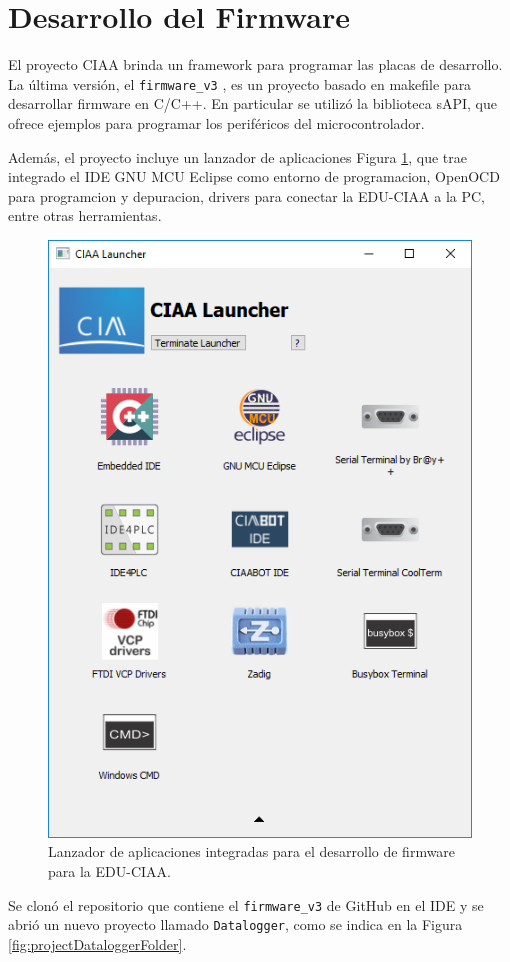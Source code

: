 \section{Desarrollo del Firmware}\label{sec:desarrolloFirmware}

El proyecto CIAA brinda un framework para programar las placas de desarrollo. La última versión, el \texttt{firmware\_v3} \cite{ciaa2024}, es un proyecto basado en makefile para desarrollar firmware en C/C++. En particular se utilizó la biblioteca sAPI, que ofrece ejemplos para programar los periféricos del microcontrolador.

Además, el proyecto incluye un lanzador de aplicaciones Figura \ref{fig:ciaaLauncher}, que trae integrado el IDE GNU MCU Eclipse como entorno de programacion, OpenOCD para programcion y depuracion, drivers para conectar la EDU-CIAA a la PC, entre otras herramientas. 

\begin{figure}[H]
    \centering
    \includegraphics[width=0.35\linewidth]{Figuras/datalogger/Firmware/ciaaLauncher.png}
    \caption{Lanzador de aplicaciones integradas para el desarrollo de firmware para la EDU-CIAA.}
    \label{fig:ciaaLauncher}
\end{figure}

Se clonó el repositorio que contiene el \texttt{firmware\_v3} de GitHub en el IDE y se abrió un nuevo proyecto llamado \texttt{Datalogger}, como se indica en la Figura \ref{fig:projectDataloggerFolder}.

